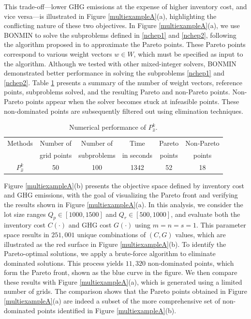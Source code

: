 \documentclass[11pt]{article}
\begin{document}
\noindent This trade-off—lower GHG emissions at the expense of higher inventory cost, and vice versa—is illustrated in Figure \ref{multiexampleA}(a), highlighting the conflicting nature of these two objectives. In Figure \ref{multiexampleA}(a), we use BONMIN to solve the subproblems defined in \eqref{nchep1} and \eqref{nchep2}, following the algorithm proposed in \cite[Appendix A.2., Algorithm 1]{Indu2025} to approximate the Pareto points. These Pareto points correspond to various weight vectors $w \in W$, which must be specified as input to the algorithm. Although we tested with other mixed-integer solvers, BONMIN \cite{Bonami2008} demonstrated better performance in solving the subproblems \eqref{nchep1} and \eqref{nchep2}. Table \ref{tablemop1} presents a summary of the number of weight vectors, reference points, subproblems solved, and the resulting Pareto and non-Pareto points. Non-Pareto points appear when the solver becomes stuck at infeasible points. These non-dominated points are subsequently filtered out using elimination techniques.
\begin{table}[H]
\small
\caption{Numerical performance of $P_{\hat{x}}^k$.}  
\centering 
\begin{tabular}{||c| c| c| c| c| c||} %
\hline \hline %
Methods &   Number of  & Number of   & Time          & Pareto    & Non-Pareto  \\  %
       &   grid points     & subproblems & in seconds    & points    &   points \\ [0.5ex] %
\hline %
$P_{\hat{x}}^k$ & 50       & 100       & 1342       & 52        & 18          \\ 
\hline
\hline %
\end{tabular}
\label{tablemop1} %
\end{table}

\noindent Figure \ref{multiexampleA}(b) presents the objective space defined by inventory cost and GHG emissions, with the goal of visualizing the Pareto front and verifying the results shown in Figure \ref{multiexampleA}(a). In this analysis, we consider the lot size ranges $Q_p \in [1000, 1500]$ and $Q_r \in [500, 1000]$, and evaluate both the inventory cost $C(\cdot)$ and GHG cost $G(\cdot)$ using $m = n = s = 1$. This parameter space results in $251,001$ unique combinations of $(C, G)$ values, which are illustrated as the red surface in Figure \ref{multiexampleA}(b).
To identify the Pareto-optimal solutions, we apply a brute-force algorithm to eliminate dominated solutions. This process yields $11,320$ non-dominated points, which form the Pareto front, shown as the blue curve in the figure. 
We then compare these results with Figure \ref{multiexampleA}(a), which is generated using a limited number of grids. The comparison shows that the Pareto points obtained in Figure \ref{multiexampleA}(a) are indeed a subset of the more comprehensive set of non-dominated points identified in Figure \ref{multiexampleA}(b).
\end{document}
